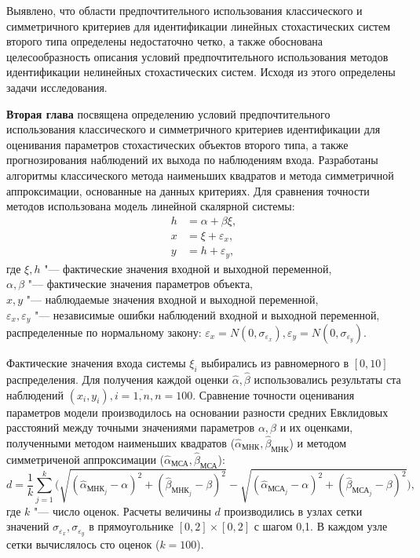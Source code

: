 Выявлено, что области предпочтительного использования классического и симметричного
критериев для идентификации линейных стохастических систем второго типа
определены недостаточно четко, а также обоснована целесообразность
описания условий предпочтительного использования методов идентификации
нелинейных стохастических систем.
Исходя из этого определены задачи исследования.

\textbf{Вторая глава} посвящена определению условий предпочтительного использования
классического и симметричного критериев идентификации
для оценивания параметров стохастических объектов второго типа,
а также прогнозирования наблюдений их выхода по наблюдениям входа.
Разработаны алгоритмы классического метода наименьших квадратов и метода симметричной
аппроксимации, основанные на данных критериях.
Для сравнения точности методов использована модель линейной скалярной системы:
\begin{equation*}
  \begin{aligned}
  h &= \alpha + \beta \xi, \\
  x &= \xi + \varepsilon_x, \\
  y &= h + \varepsilon_y,
  \end{aligned}
\end{equation*}
где \( \xi, h \) "--- фактические значения входной и выходной переменной, \\
\hspace*{6mm} \( \alpha, \beta \) "--- фактические значения параметров объекта, \\
\hspace*{6mm} \( x, y \) "--- наблюдаемые значения входной и выходной переменной, \\
\hspace*{6mm} \( \varepsilon_x, \varepsilon_y \) "--- независимые ошибки наблюдений
входной и выходной переменной, распределенные по нормальному закону:
\(
\varepsilon_x = N(0, \sigma_{\varepsilon_x}),
\varepsilon_y = N(0, \sigma_{\varepsilon_y})
\).

Фактические значения входа системы \( \xi_i \) выбирались из равномерного в \( [0, 10] \) распределения.
Для получения каждой оценки \( \hat{\alpha}, \hat{\beta} \) использовались результаты
ста наблюдений \( ( x_i, y_i ), i = \overline{1, n}, n = 100 \).
Сравнение точности оценивания параметров модели производилось на основании
разности средних Евклидовых расстояний между точными значениями параметров
\( \alpha, \beta \) и их оценками, полученными методом наименьших квадратов
(\( \hat{\alpha}_{\text{МНК}}, \hat{\beta}_{\text{МНК}} \))
и методом симметриченой аппроксимации
(\( \hat{\alpha}_{\text{МСА}}, \hat{\beta}_{\text{МСА}} \)):
\begin{equation*}
  d =
  \frac{1}{k} \sum_{j=1}^k
  \Bigg(
  \sqrt{(\hat{\alpha}_{\text{МНК}_j} - \alpha)^2 + (\hat{\beta}_{\text{МНК}_j} - \beta)^2} -
  \sqrt{(\hat{\alpha}_{\text{МСА}_j} - \alpha)^2 + (\hat{\beta}_{\text{МСА}_j} - \beta)^2}
  \Bigg),
\end{equation*}
где \( k \) "--- число оценок.
Расчеты величины \( d \) производились в узлах сетки значений
\( \sigma_{\varepsilon_x}, \sigma_{\varepsilon_y} \) в прямоугольнике
\( [0, 2] \times [0, 2] \) с шагом 0{,}1.
В каждом узле сетки вычислялось сто оценок (\( k = 100 \)).

